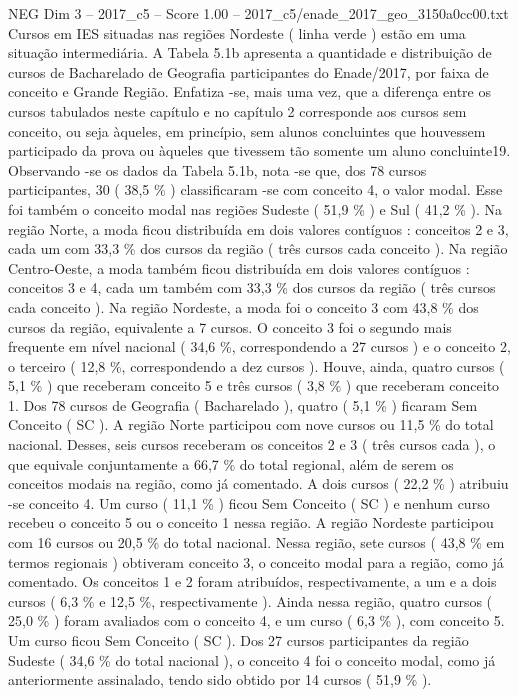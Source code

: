 \begin{textsample}{NEG Dim 3 – 2017\_c5 – Score 1.00 – 2017\_c5/enade\_2017\_geo\_3150a0cc00.txt}
Cursos em IES situadas nas regiões Nordeste ( linha verde ) estão em uma situação intermediária.
A Tabela 5.1b apresenta a quantidade e distribuição de cursos de Bacharelado de Geografia participantes do Enade/2017, por faixa de conceito e Grande Região.
Enfatiza -se, mais uma vez, que a diferença entre os cursos tabulados neste capítulo e no capítulo 2 corresponde aos cursos sem conceito, ou seja àqueles, em princípio, sem alunos concluintes que houvessem participado da prova ou àqueles que tivessem tão somente um aluno concluinte19.
Observando -se os dados da Tabela 5.1b, nota -se que, dos 78 cursos participantes, 30 ( 38,5 \% ) classificaram -se com conceito 4, o valor modal.
Esse foi também o conceito modal nas regiões Sudeste ( 51,9 \% ) e Sul ( 41,2 \% ).
Na região Norte, a moda ficou distribuída em dois valores contíguos : conceitos 2 e 3, cada um com 33,3 \% dos cursos da região ( três cursos cada conceito ).
Na região Centro-Oeste, a moda também ficou distribuída em dois valores contíguos : conceitos 3 e 4, cada um também com 33,3 \% dos cursos da região ( três cursos cada conceito ).
Na região Nordeste, a moda foi o conceito 3 com 43,8 \% dos cursos da região, equivalente a 7 cursos.
O conceito 3 foi o segundo mais frequente em nível nacional ( 34,6 \%, correspondendo a 27 cursos ) e o conceito 2, o terceiro ( 12,8 \%, correspondendo a dez cursos ).
Houve, ainda, quatro cursos ( 5,1 \% ) que receberam conceito 5 e três cursos ( 3,8 \% ) que receberam conceito 1.
Dos 78 cursos de Geografia ( Bacharelado ), quatro ( 5,1 \% ) ficaram Sem Conceito ( SC ).
A região Norte participou com nove cursos ou 11,5 \% do total nacional.
Desses, seis cursos receberam os conceitos 2 e 3 ( três cursos cada ), o que equivale conjuntamente a 66,7 \% do total regional, além de serem os conceitos modais na região, como já comentado.
A dois cursos ( 22,2 \% ) atribuiu -se conceito 4.
Um curso ( 11,1 \% ) ficou Sem Conceito ( SC ) e nenhum curso recebeu o conceito 5 ou o conceito 1 nessa região.
A região Nordeste participou com 16 cursos ou 20,5 \% do total nacional.
Nessa região, sete cursos ( 43,8 \% em termos regionais ) obtiveram conceito 3, o conceito modal para a região, como já comentado.
Os conceitos 1 e 2 foram atribuídos, respectivamente, a um e a dois cursos ( 6,3 \% e 12,5 \%, respectivamente ).
Ainda nessa região, quatro cursos ( 25,0 \% ) foram avaliados com o conceito 4, e um curso ( 6,3 \% ), com conceito 5.
Um curso ficou Sem Conceito ( SC ).
Dos 27 cursos participantes da região Sudeste ( 34,6 \% do total nacional ), o conceito 4 foi o conceito modal, como já anteriormente assinalado, tendo sido obtido por 14 cursos ( 51,9 \% ).

\end{textsample}
